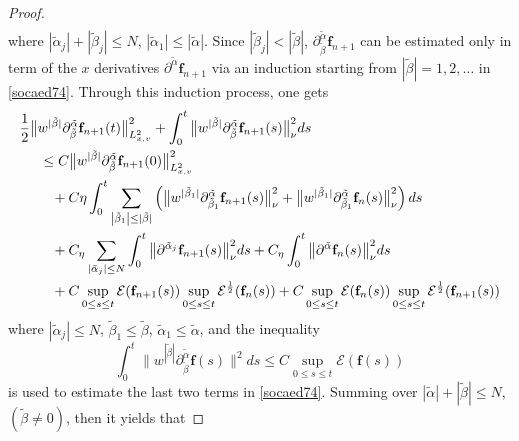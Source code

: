 \documentclass[reqno]{amsart}
\numberwithin{equation}{section}
\numberwithin{equation}{section}
\begin{document}
\begin{proof}
\begin{align}
			\end{align}
			 where $| \tilde{\alpha}_j |+| \tilde{\beta}_j | \leq N$, $\left|\tilde{\alpha}_{1}\right|\leq|\tilde{\alpha}|$. Since $|\tilde{\beta}_j| < |\tilde{\beta}|$, $\partial_{\tilde{\beta}}^{\tilde{\alpha}} \mathbf{f}_{n+1}$ can be estimated only in term of the $x$ derivatives $\partial^{\tilde{\alpha}} \mathbf{f}_{n+1}$ via an induction starting from $|\tilde{\beta}| = 1, 2,  \dots$ in \eqref{socaed74}. Through this induction process, one gets 
			\begin{align*}
				&\frac{1}{2}\big\|w^{|\tilde{\beta}|}\partial_{\tilde{\beta}}^{\tilde{\alpha}} \mathbf{f}_{n+1}(t)\big\|^2_{L^{2}_{x,v}}+\int_{0}^{t}\big\|w^{|\tilde{\beta}|}\partial_{\tilde{\beta}}^{\tilde{\alpha}} \mathbf{f}_{n+1}(s)\big\|^2_{\nu} ds \\
				&\hspace{0.5cm}\leq C \big\|w^{|\tilde{\beta}|}\partial_{\tilde{\beta}}^{\tilde{\alpha}} \mathbf{f}_{n+1}(0)\big\|^2_{L^{2}_{x,v}} \\
				&\hspace{0.8cm}+ C\eta \int_0^t \sum_{\left|\tilde{\beta}_{1}\right|\leq|\tilde{\beta}|}\left(\big\|w^{|\tilde{\beta}_1|}\partial_{\tilde{\beta}_1}^{\tilde{\alpha}} \mathbf{f}_{n+1}(s)\big\|^2_{\nu} + \big\|w^{|\tilde{\beta}_1|}\partial_{\tilde{\beta}_1}^{\tilde{\alpha}} \mathbf{f}_{n}(s)\big\|^2_{\nu} \right)ds \\
				&\hspace{0.8cm}+ C_\eta \sum_{|\tilde{\alpha}_j| \leq N} \int_0^t  \big\| \partial^{\tilde{\alpha}_j} \mathbf{f}_{n+1}(s) \big\|_{\nu}^2 ds + C_\eta \int_0^t \big\| \partial^{\tilde{\alpha}} \mathbf{f}_{n} (s)\big\|_{\nu}^2 ds\\
				&\hspace{0.8cm}+ C \sup_{0 \leq s \leq t} \mathcal{E}(\mathbf{f}_{n+1}(s)) \sup_{0 \leq s \leq t} \mathcal{E}^{\frac{1}{2}}(\mathbf{f}_{n}(s)) 
			+ C \sup_{0 \leq s \leq t} \mathcal{E}(\mathbf{f}_{n}(s)) \sup_{0 \leq s \leq t} \mathcal{E}^{\frac{1}{2}}(\mathbf{f}_{n+1}(s))
			\end{align*}
			where $|\tilde{\alpha}_j| \leq N$, $\tilde{\beta}_1 \leq \tilde{\beta}$, $\tilde{\alpha}_1 \leq \tilde{\alpha}$, and the inequality 
			\[
			\int_0^t \big\| w^{|\tilde{\beta}|}\partial_{\tilde{\beta}}^{\tilde{\alpha}} \mathbf{f}(s) \big\|^2 ds \leq C \sup_{0 \leq s \leq t} \mathcal{E}(\mathbf{f}(s))
			\]
			is used to estimate the last two terms in \eqref{socaed74}. Summing over $|\tilde{\alpha}| + |\tilde{\beta}| \leq N$,  $(\tilde{\beta} \neq 0)$, then it yields that

\end{proof}
\end{document}
